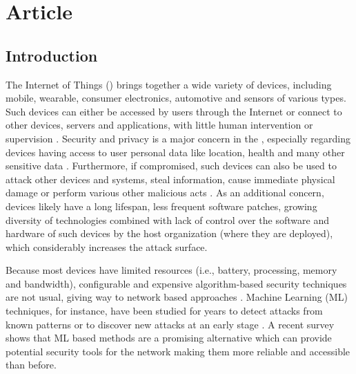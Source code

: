 \section{Article}

\subsection{Introduction}

The Internet of Things (\iot) brings together a wide variety of devices,
including mobile, wearable, consumer electronics, automotive and sensors of
various types.
% 
Such devices can either be accessed by users through the Internet or connect
to other devices, servers and applications,
with little human intervention or supervision
\cite{Tahsien2020,abane2019,haddadpajouh2019survey,Shanbhag2015}.
% 
Security and privacy is a major concern in the \iot, especially regarding
devices having access to user personal data like
location, health and many other sensitive data \cite{sengupta2020comprehensive}.
% 
Furthermore, if compromised, such devices can also be used to attack other
devices and systems, steal information, cause immediate physical damage or
perform various other malicious acts \cite{Kolias2017mirai}.
% 
As an additional concern, \iot devices likely have a long lifespan, less frequent
software patches, growing diversity of technologies combined with lack of
control over the software and hardware of such devices by the host organization
(where they are deployed), which considerably increases the attack surface.

Because most \iot devices have limited resources (i.e., battery, processing,
memory and bandwidth), configurable and expensive algorithm-based
security techniques are not usual, giving way to network based approaches 
\cite{Zhou2017}.
Machine Learning (ML) techniques, for instance, have been studied for years to detect attacks
from known patterns or to discover new attacks at an early stage
\cite{buczak2016survey,mitchell2014survey}.
A recent survey \cite{Tahsien2020} shows that ML based methods are a
promising alternative which can provide potential security tools for the \iot
network making them more reliable and accessible than before.

